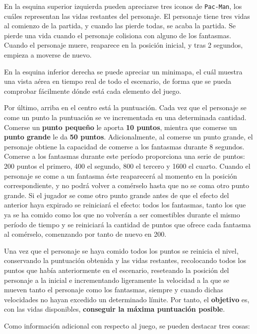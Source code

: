 \documentclass[11pt,a4paper]{article}
\begin{document}
En la esquina superior izquierda pueden apreciarse tres iconos de \texttt{Pac-Man}, los cuáles
representan las vidas restantes del personaje. El personaje tiene tres vidas al comienzo de
la partida, y cuando las pierde todas, se acaba la partida. Se pierde una vida cuando el
personaje colisiona con alguno de los fantasmas. Cuando el personaje muere, reaparece en la
posición inicial, y tras 2 segundos, empieza a moverse de nuevo.

En la esquina inferior derecha se puede apreciar un minimapa, el cuál muestra una vista aérea en
tiempo real de todo el escenario, de forma que se pueda comprobar fácilmente dónde está cada
elemento del juego.

Por último, arriba en el centro está la puntuación. Cada vez que el personaje se come un punto
la puntuación se ve incrementada en una determinada cantidad.
Comerse un \textbf{punto pequeño} le aporta \textbf{10 puntos},
mientra que comerse un \textbf{punto grande} le da \textbf{50 puntos}. Adicionalmente, al comerse
un punto grande, el personaje obtiene la capacidad de comerse a los fantasmas durante 8 segundos.
Comerse a los fantasmas durante este período proporciona una serie de puntos: 200 puntos el
primero, 400 el segundo, 800 el tercero y 1600 el cuarto. Cuando el personaje se come a un
fantasma éste reaparecerá al momento en la posición correspondiente, y no podrá volver a
comérselo hasta que no se coma otro punto grande. Si el jugador se come otro punto grande antes
de que el efecto del anterior haya expirado se reiniciará el efecto: todos los fantasmas, tanto
los que ya se ha comido como los que no volverán a ser comestibles durante el mismo período de
tiempo y se reiniciará la cantidad de puntos que ofrece cada fantasma al comérselo, comenzando
por tanto de nuevo en 200.

Una vez que el personaje se haya comido todos los puntos se reinicia el nivel, conservando
la puntuación obtenida y las vidas restantes, recolocando todos los puntos que había anteriormente
en el escenario, reseteando la posición del personaje a la inicial e incrementando ligeramente
la velocidad a la que se mueven tanto el personaje como los fantasmas, siempre y cuando dichas
velocidades no hayan excedido un determinado límite. Por tanto, el \textbf{objetivo} es, con las
vidas disponibles, \textbf{conseguir la máxima puntuación posible}.

Como información adicional con respecto al juego, se pueden destacar tres cosas:
\end{document}
